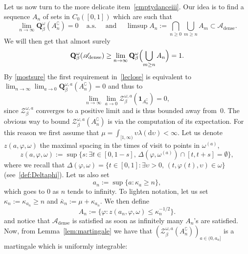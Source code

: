 \documentclass[JEP,XML,SOM,Unicode,published]{cedram}
\let\mathcal\mathscr
\let\sep:
\theoremstyle{definition}
\newcommand{\dd}{\mathrm{d}}
\newcommand{\ind}{\mathbf{1}}
\let\cc\complement
\newcommand{\cA}{{\ensuremath{\mathcal A}} }
\newcommand{\cZ}{{\ensuremath{\mathcal Z}} }
\newcommand{\bQ}{{\ensuremath{\mathbf Q}} }
\let\gb\beta
\let\gl\lambda
\let\ups\upsilon
\let\go\omega
\begin{document}
Let us now turn to the more delicate item~\eqref{emptydanceiii}.
Our idea is to find a sequence $A_{n}$ of sets in $C_0([0,1])$ which are such that
\begin{equation}\label{leclose}
\lim_{n\to\infty} \bQ^{\go}_{\gb}(A_n^{\cc}) =0 \, \quad \text{a.s.} \quad
\text{ and } \quad
\limsup A_{n} := \bigcap_{n\ge 0} \bigcup_{m\ge n} A_m\subset \cA_{\mathrm{dense}}.
\end{equation}
We will then get that almost surely
\begin{equation}
\bQ^{\go}_\beta (\cA_{\mathrm{dense}})\ge \lim_{n\to \infty } \bQ^{\go}_\beta \Bigl(\bigcup_{m\ge n} A_{n}\Bigr)=1.
\end{equation}
By \eqref{mostsure} the first requirement in~\eqref{leclose} is equivalent to
$\lim_{n\to\infty} \lim_{a\to 0} \bQ^{\go,a}_\beta (A^{\cc}_{n}) =0$
and thus to
\begin{equation}
\label{Zan}
\lim_{n\to\infty} \lim_{a\to 0} \cZ^{\go,a}_\beta (\ind_{A^{\cc}_{n}}) =0,
\end{equation}
since $\cZ^{\go,a}_\beta$
converges to a positive limit and is thus bounded away from~$0$.
The obvious way to bound $\cZ^{\go,a}_\beta (A^{\cc}_{n})$ is via the computation of its expectation. For this reason we first assume
that $\mu=\int_{[1,\infty)}\ups \gl (\dd \ups)<\infty$. Let
us denote $z(a,\varphi,\go)$ the maximal spacing in the times of visit to points in $\go^{(a)}$, \ie 
\begin{equation*}
z(a,\varphi,\go):= \sup \bigl\{ s \sep \exists t\in [0,1-s], \, \varDelta(\varphi,\go^{(a)})\cap[t,t+s]=\emptyset\bigr\},
\end{equation*}
where we recall that $\varDelta (\varphi, \go) = \{t\in [0,1] \sep \exists \ups>0,\, (t,\varphi(t),\ups) \in \go\} $ (see~\eqref{def:Deltaphi}).
Let us also set
\begin{equation*}
a_n:= \sup \{ a \sep \kappa_a \ge n \},
\end{equation*}
which goes to $0$ as $n$ tends to infinity.
To lighten notation, let us set $ \kappa_n:= \kappa_{a_n} \geq n$ and $\bar \kappa_n:= \mu+ \kappa_{a_n}$.
We then define
\begin{equation}
A_{n}:= \bigl\{ \varphi \sep z(a_n,\varphi,\go) \le \kappa_n^{-1/2} \bigr\}.
\end{equation}
and notice that $\cA_{\mathrm{dense}}$ is satisfied as soon as infinitely many $A_{n}$'s are satisfied. Now, from Lemma~\ref{lem:martingale} we have that $(\cZ^{\go, a }_{\beta}(A_{n}^{\cc}))_{a\in(0,a_n]}$ is a martingale which is uniformly integrable:
\end{document}
